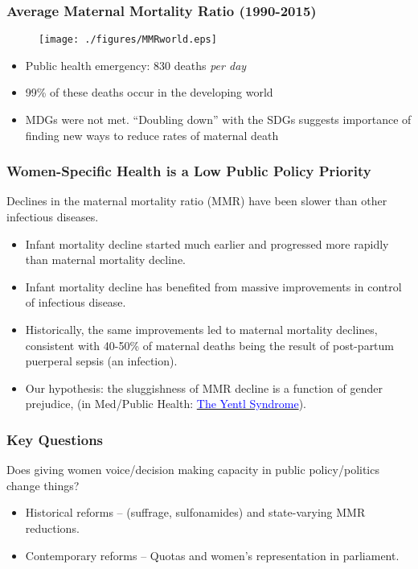 \documentclass[10pt,letterpaper,subeqn]{beamer}
\begin{document}
\begin{frame}[label=MMRmap]
\frametitle{Average Maternal Mortality Ratio (1990-2015)}
\begin{figure}[h!]
\centering
\texttt{[image: ./figures/MMRworld.eps]}
\end{figure}
\begin{itemize}
\item Public health emergency: 830 deaths \emph{per day}
\item 99\% of these deaths occur in the developing world
\item MDGs were not met.  ``Doubling down'' with the SDGs suggests
  importance of finding new ways to reduce rates of maternal death
\end{itemize}
\end{frame}

\begin{frame}
\frametitle{Women-Specific Health is a Low Public Policy Priority}
  Declines in the maternal mortality ratio (MMR) have been slower than other infectious diseases. \vspace{4mm}
\begin{itemize}
  \setlength{\itemsep}{10pt}
	\item Infant mortality decline started much earlier and progressed more rapidly 
        than maternal mortality decline.
	\item Infant mortality decline has benefited from massive improvements in 
        control of infectious disease. 
	\item Historically, the same improvements led to maternal mortality declines, 
        consistent with 40-50\% of maternal deaths being the result of post-partum
        puerperal sepsis (an infection).
  \item Our hypothesis: the sluggishness of MMR decline is a function of gender 
        prejudice, (in Med/Public Health: \hyperlink{Yentl}{\textcolor{blue}
        {The Yentl Syndrome}}).
\end{itemize}
\end{frame}


\begin{frame}
\frametitle{Key Questions}
Does giving women voice/decision making capacity in public policy/politics change things? 
\vspace{4.5mm}
\begin{itemize}
  \setlength{\itemsep}{9.5pt}
	\item Historical reforms -- (suffrage, sulfonamides) and state-varying MMR reductions.
  \item Contemporary reforms -- Quotas and women's representation in parliament.
\end{itemize}
\end{frame}
\end{document}
